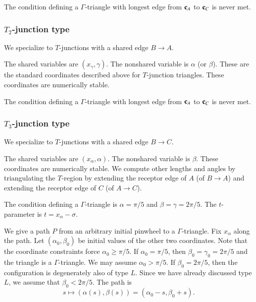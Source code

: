 The condition defining a $\Gamma$-triangle with longest edge from ${\mathbf c}_A$ to ${\mathbf c}_C$ is never met.

\subsubsection{$T_2$-junction type}

We specialize to $T$-junctions with a shared edge $B\to A$.  

The shared variables are $(x_\gamma,\gamma)$.  The nonshared variable is $\alpha$ (or $\beta$).  These are the
standard coordinates described above for $T$-junction triangles.
These coordinates are numerically stable.    

The condition defining a $\Gamma$-triangle with longest edge from ${\mathbf c}_A$ to ${\mathbf c}_C$ is never met.

\subsubsection{$T_3$-junction type}

We specialize to $T$-junctions with a shared edge $B\to C$.  

The shared variables are $(x_\alpha,\alpha)$.  The nonshared variable is $\beta$.
These coordinates are numerically stable.  
  We compute other lengths and angles by triangulating the $T$-region by
extending the receptor edge of $A$ (of $B\to A$) and extending the receptor edge of $C$ (of $A\to C$).

The condition defining a $\Gamma$-triangle is $\alpha=\pi/5$ and $\beta=\gamma=2\pi/5$.   The $t$-parameter is $t =x_\alpha - \sigma$.

We give a path $P$ from an arbitrary initial pinwheel 
to a $\Gamma$-triangle.  Fix $x_\alpha$ along the path.  Let $(\alpha_0,\beta_0)$ be initial values of the other two coordinates.
Note that the coordinate constraints force $\alpha_0\ge \pi/5$. If $\alpha_0=\pi/5$, then $\beta_0=\gamma_0=2\pi/5$ and the triangle
is a $\Gamma$-triangle.  We may assume $\alpha_0 > \pi/5$.
If $\beta_0=2\pi/5$, then the configuration is degenerately also of type $L$.  Since we have already discussed
type $L$, we assume that $\beta_0<2\pi/5$.
The path is 
\[
s\mapsto (\alpha(s),\beta(s)) = (\alpha_0 - s,\beta_0+s).
\]


